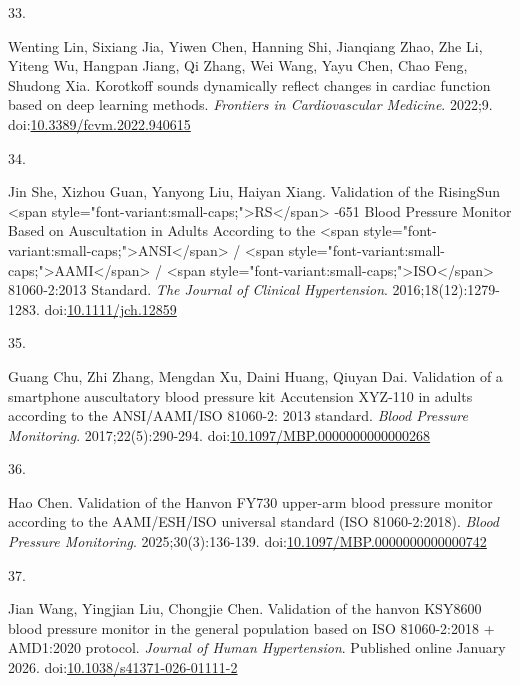 \documentclass[
  12pt,
  letterpaper,
  openany,
  oneside]{book}
\newlength{\cslhangindent}
\newlength{\csllabelwidth}
\newenvironment{CSLReferences}[2] %
 {\begin{list}{}{%
  \setlength{\itemindent}{0pt}
  \setlength{\leftmargin}{0pt}
  \setlength{\parsep}{0pt}
  \ifodd #1
   \setlength{\leftmargin}{\cslhangindent}
   \setlength{\itemindent}{-1\cslhangindent}
  \fi
  \setlength{\itemsep}{#2\baselineskip}}}
 {\end{list}}
\newcommand{\CSLLeftMargin}[1]{\parbox[t]{\csllabelwidth}{\strut#1\strut}}
\newcommand{\CSLRightInline}[1]{\parbox[t]{\linewidth - \csllabelwidth}{\strut#1\strut}}
\begin{document}
\begin{CSLReferences}{0}{1}
\CSLLeftMargin{33. }%
\CSLRightInline{Wenting Lin, Sixiang Jia, Yiwen Chen, Hanning Shi,
Jianqiang Zhao, Zhe Li, Yiteng Wu, Hangpan Jiang, Qi Zhang, Wei Wang,
Yayu Chen, Chao Feng, Shudong Xia. Korotkoff sounds dynamically reflect
changes in cardiac function based on deep learning methods.
\emph{Frontiers in Cardiovascular Medicine}. 2022;9.
doi:\href{https://doi.org/10.3389/fcvm.2022.940615}{10.3389/fcvm.2022.940615}}

\CSLLeftMargin{34. }%
\CSLRightInline{Jin She, Xizhou Guan, Yanyong Liu, Haiyan Xiang.
Validation of the {RisingSun} {\textless{}}span
style="font-variant:small-caps;"{\textgreater{}}{RS}{\textless{}}/span{\textgreater{}}
‐651 {Blood} {Pressure} {Monitor} {Based} on {Auscultation} in {Adults}
{According} to the {\textless{}}span
style="font-variant:small-caps;"{\textgreater{}}{ANSI}{\textless{}}/span{\textgreater{}}
/ {\textless{}}span
style="font-variant:small-caps;"{\textgreater{}}{AAMI}{\textless{}}/span{\textgreater{}}
/ {\textless{}}span
style="font-variant:small-caps;"{\textgreater{}}{ISO}{\textless{}}/span{\textgreater{}}
81060‐2:2013 {Standard}. \emph{The Journal of Clinical Hypertension}.
2016;18(12):1279-1283.
doi:\href{https://doi.org/10.1111/jch.12859}{10.1111/jch.12859}}

\CSLLeftMargin{35. }%
\CSLRightInline{Guang Chu, Zhi Zhang, Mengdan Xu, Daini Huang, Qiuyan
Dai. Validation of a smartphone auscultatory blood pressure kit
{Accutension} {XYZ}-110 in adults according to the {ANSI}/{AAMI}/{ISO}
81060-2: 2013 standard. \emph{Blood Pressure Monitoring}.
2017;22(5):290-294.
doi:\href{https://doi.org/10.1097/MBP.0000000000000268}{10.1097/MBP.0000000000000268}}

\CSLLeftMargin{36. }%
\CSLRightInline{Hao Chen. Validation of the {Hanvon} {FY730} upper-arm
blood pressure monitor according to the {AAMI}/{ESH}/{ISO} universal
standard ({ISO} 81060-2:2018). \emph{Blood Pressure Monitoring}.
2025;30(3):136-139.
doi:\href{https://doi.org/10.1097/MBP.0000000000000742}{10.1097/MBP.0000000000000742}}

\CSLLeftMargin{37. }%
\CSLRightInline{Jian Wang, Yingjian Liu, Chongjie Chen. Validation of
the hanvon {KSY8600} blood pressure monitor in the general population
based on {ISO} 81060-2:2018 + {AMD1}:2020 protocol. \emph{Journal of
Human Hypertension}. Published online January 2026.
doi:\href{https://doi.org/10.1038/s41371-026-01111-2}{10.1038/s41371-026-01111-2}}


\end{CSLReferences}
\end{document}
